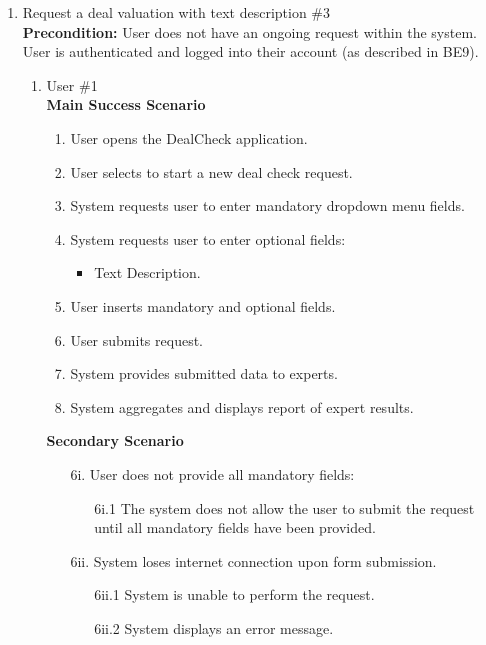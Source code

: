 \documentclass[]{article}
\begin{document}
\begin{enumerate}[{\bf {BE}1.}]
\item Request a deal valuation with text description \#3 \\
    {\bf Precondition:} User does not have an ongoing request within the system. User is authenticated and logged into their account (as described in BE9).
    \begin{enumerate}[{\bf VP1.}]
        \item User \#1 \\
        {\bf Main Success Scenario}
        \begin{enumerate}[1.]
            \item User opens the DealCheck application.
            \item User selects to start a new deal check request.
            \item System requests user to enter mandatory dropdown menu fields.
            \item System requests user to enter optional fields:
            \begin{itemize}
                \item Text Description.
            \end{itemize}
            \item User inserts mandatory and optional fields.
            \item User submits request.
            \item System provides submitted data to experts.
            \item System aggregates and displays report of expert results.
        \end{enumerate}
        
        {\bf Secondary Scenario} \\
		\begin{enumerate}
			\item [6i.] User does not provide all mandatory fields:
			\begin{enumerate}
				\item [6i.1] The system does not allow the user to submit the request until all mandatory fields have been provided.
			\end{enumerate}
		
			\item [6ii.] System loses internet connection upon form submission.
			\begin{enumerate}
				\item [6ii.1] System is unable to perform the request.
				\item [6ii.2] System displays an error message.
			\end{enumerate}
		

\end{enumerate}
\end{enumerate}
\end{enumerate}
\end{document}
